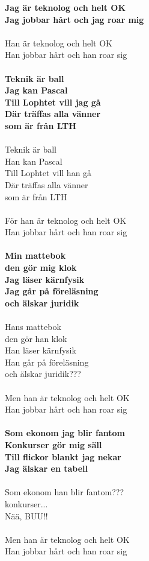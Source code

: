 \documentclass{article}
\begin{document}
\noindent\textbf{Jag är teknolog och helt OK\\
Jag jobbar hårt och jag roar mig}\\\\
\noindent Han är teknolog och helt OK\\
Han jobbar hårt och han roar sig\\\\
\noindent\textbf{Teknik är ball\\
Jag kan Pascal\\
Till Lophtet vill jag gå\\
Där träffas alla vänner\\
som är från LTH}\\\\
\noindent Teknik är ball\\
Han kan Pascal\\
Till Lophtet vill han gå\\
Där träffas alla vänner\\
som är från LTH\\\\
\noindent För han är teknolog och helt OK\\
Han jobbar hårt och han roar sig\\\\
\noindent\textbf{Min mattebok \\
den gör mig klok\\
Jag läser kärnfysik\\
Jag går på föreläsning\\
och älskar juridik}\\\\
\noindent Hans mattebok\\
den gör han klok\\
Han läser kärnfysik\\
Han går på föreläsning\\
och älskar juridik???\\\\
\noindent Men han är teknolog och helt OK\\
Han jobbar hårt och han roar sig\\\\
\noindent\textbf{Som ekonom jag blir fantom\\
Konkurser gör mig säll\\
Till flickor blankt jag nekar\\
Jag älskar en tabell}\\\\
\noindent Som ekonom han blir fantom???\\
konkurser...\\
Nää, BUU!!\\\\
\noindent Men han är teknolog och helt OK\\
Han jobbar hårt och han roar sig\\
\end{document}
